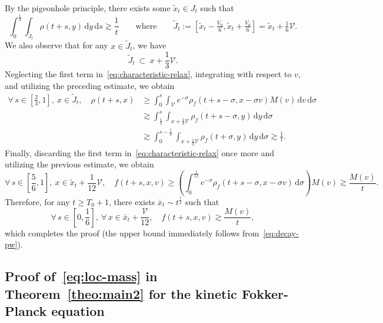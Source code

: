 \documentclass[11pt]{amsart}
\theoremstyle{definition}
\theoremstyle{remark}
\numberwithin{equation}{section}
\def\VV{{\mathcal V}}
\newcommand{\dd}{{\, \mathrm d}}
\begin{document}
By the pigeonhole principle, there exists some $\tilde{x}_t \in J_t$ such that
\begin{equation*}
  \int_{0}^{\frac{1}{3}} \!\! \int_{\tilde J_t} \rho (t+s,y) \dd y  \dd s\gtrsim \frac{1}{t} \qquad \text{where} \qquad 
  \tilde J_t := \left[\tilde x_t- \tfrac{V_0}{6}, \tilde x_t + \tfrac{V_0}{6}\right] = \tilde x_t + \tfrac16 \VV.
\end{equation*}
We also observe that for any $x \in \tilde{J}_t$, we have
\begin{equation*}
  \tilde{J}_t \ \subset \ x + \frac13 \VV.
\end{equation*}
Neglecting the first term in~\eqref{eq:characteristic-relax}, integrating with respect to $v$, and utilizing the preceding estimate, we obtain
\begin{align*}
  \forall \, s \in \left[\frac{2}{3},1\right], \ x \in \tilde J_t, \quad \rho(t+s,x)
  &\ge \int_0^s \! \int_\VV e^{-  \sigma } \rho_f(t+s- \sigma ,x- \sigma  v) M(v) \dd v\dd \sigma \\
  &\gtrsim  \int_{\tfrac13}^{s} \! \int_{x+\tfrac13\VV}  \rho_f(t+s- \sigma ,y) \dd y \dd \sigma \\
  & \gtrsim  \int_0^{s-\tfrac13} \!\!\! \int_{x+\tfrac13\VV}  \rho_f(t+\sigma,y) \dd y \dd \sigma \gtrsim  \frac{1}{t}.
\end{align*}
Finally, discarding the first term in~\eqref{eq:characteristic-relax} once more and utilizing the previous estimate, we obtain
\begin{equation*}
  \forall \, s \in \left[ \frac{5}{6},1 \right], \ x \in \tilde x_t + \frac1{12}\VV, \quad f(t+s,x,v) \ge \left( \int_0^{\tfrac{1}{12}} e^{- \sigma } \rho_f(t+s- \sigma ,x-\sigma v) \dd \sigma \right) M(v) \gtrsim \frac{M(v)}{t}.
\end{equation*}
Therefore, for any $t \geq T_0 + 1$, there exists $\bar{x}_t \sim t^{\frac{1}{2}}$ such that
\begin{equation*}
  \forall\, s \in \left[0, \frac{1}{6}\right],\ \forall\, x \in \bar{x}_t + \frac{\VV}{12}, \quad f(t+s, x, v) \gtrsim \frac{M(v)}{t},
\end{equation*}
which completes the proof (the upper bound immediately follows from~\eqref{eq:decay-pw}).

 \subsection{Proof of~\eqref{eq:loc-mass} in Theorem~\ref{theo:main2} for  the kinetic Fokker-Planck equation}
\label{subsec:loc-mass-kFP}
\end{document}
